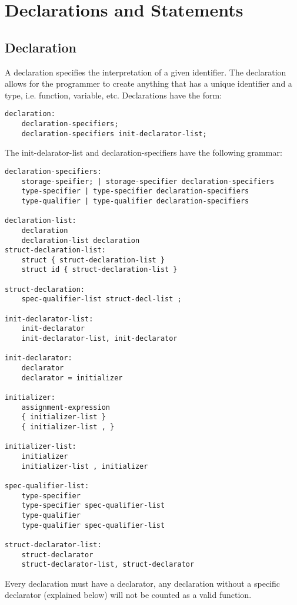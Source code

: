 \documentclass[./LRM_main.tex]{subfiles}
\begin{document}


\chapter{Declarations and Statements}
\section{Declaration}
A declaration specifies the interpretation of a given identifier. The declaration allows for the programmer to create anything that has a unique identifier and a type, i.e. function, variable, etc. Declarations have the form:
\begin{lstlisting}
declaration:
	declaration-specifiers;
	declaration-specifiers init-declarator-list;
\end{lstlisting}
The init-delarator-list and declaration-specifiers have the following grammar:
\begin{lstlisting}
declaration-specifiers:
	storage-speifier; | storage-specifier declaration-specifiers
	type-specifier | type-specifier declaration-specifiers
	type-qualifier | type-qualifier declaration-specifiers
	
declaration-list:
	declaration
	declaration-list declaration
struct-declaration-list:
	struct { struct-declaration-list }
	struct id { struct-declaration-list }

struct-declaration:
	spec-qualifier-list struct-decl-list ;

init-declarator-list:
	init-declarator
	init-declarator-list, init-declarator
	
init-declarator:
	declarator
	declarator = initializer

initializer:
	assignment-expression
	{ initializer-list }
	{ initializer-list , }

initializer-list:
	initializer
	initializer-list , initializer

spec-qualifier-list:
	type-specifier
	type-specifier spec-qualifier-list
	type-qualifier
	type-qualifier spec-qualifier-list

struct-declarator-list:
	struct-declarator
	struct-declarator-list, struct-declarator
\end{lstlisting}
Every declaration must have a declarator, any declaration without a specific declarator (explained below) will not be counted as a valid function.
\end{document}
